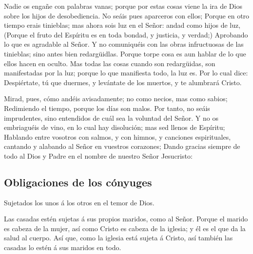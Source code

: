  Nadie os engañe con palabras vanas; porque por estas
cosas viene la ira de Dios sobre los hijos de desobediencia.
 No seáis pues aparceros con ellos;  Porque
en otro tiempo erais tinieblas; mas ahora sois luz en el Señor: andad
como hijos de luz,  (Porque el fruto del Espíritu es en
toda bondad, y justicia, y verdad;)  Aprobando lo que es
agradable al Señor.  Y no comuniquéis con las obras
infructuosas de las tinieblas; sino antes bien redargüidlas.
 Porque torpe cosa es aun hablar de lo que ellos hacen en
oculto.  Mas todas las cosas cuando son redargüidas, son
manifestadas por la luz; porque lo que manifiesta todo, la luz es.
 Por lo cual dice: Despiértate, tú que duermes, y
levántate de los muertos, y te alumbrará Cristo.

 Mirad, pues, cómo andéis avisadamente; no como necios,
mas como sabios;  Redimiendo el tiempo, porque los días
son malos.  Por tanto, no seáis imprudentes, sino
entendidos de cuál sea la voluntad del Señor.  Y no os
embriaguéis de vino, en lo cual hay disolución; mas sed llenos de
Espíritu;  Hablando entre vosotros con salmos, y con
himnos, y canciones espirituales, cantando y alabando al Señor en
vuestros corazones;  Dando gracias siempre de todo al
Dios y Padre en el nombre de nuestro Señor Jesucristo:

\hypertarget{obligaciones-de-los-cuxf3nyuges}{%
\subsection{Obligaciones de los
cónyuges}\label{obligaciones-de-los-cuxf3nyuges}}

 Sujetados los unos á los otros en el temor de Dios.

 Las casadas estén sujetas á sus propios maridos, como al
Señor.  Porque el marido es cabeza de la mujer, así como
Cristo es cabeza de la iglesia; y él es el que da la salud al cuerpo.
 Así que, como la iglesia está sujeta á Cristo, así
también las casadas lo estén á sus maridos en todo.

